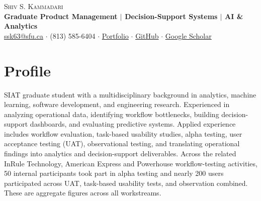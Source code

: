 \documentclass[10pt,a4paper]{article}
\begin{document}
\begin{center}{\LARGE\scshape Shiv S. Kammadari}\\[3pt]
{\large\bfseries Graduate Product Management $|$ Decision-Support Systems $|$ AI \& Analytics}\\[4pt]
\href{mailto:ssk63@sfu.ca}{ssk63@sfu.ca} $\cdot$ (813) 585-6404 $\cdot$ \href{https://shivkammadari23.github.io/}{Portfolio} $\cdot$ \href{https://github.com/shivkammadari23}{GitHub} $\cdot$ \href{https://scholar.google.com/citations?hl=en\&user=CRAJqL0AAAAJ}{Google Scholar}\end{center}\vspace{-6pt}
\section{Profile}
SIAT graduate student with a multidisciplinary background in analytics, machine learning, software development, and engineering research. Experienced in analyzing operational data, identifying workflow bottlenecks, building decision-support dashboards, and evaluating predictive systems. Applied experience includes workflow evaluation, task-based usability studies, alpha testing, user acceptance testing (UAT), observational testing, and translating operational findings into analytics and decision-support deliverables. Across the related InRule Technology, American Express and Powerhouse workflow-testing activities, 50 internal participants took part in alpha testing and nearly 200 users participated across UAT, task-based usability tests, and observation combined. These are aggregate figures across all workstreams.
\end{document}
